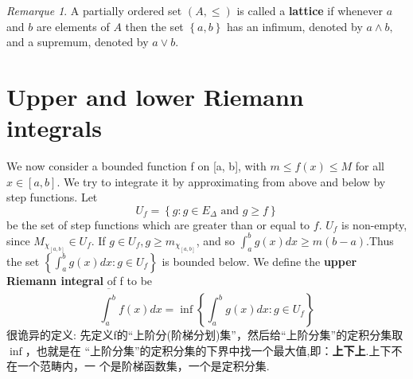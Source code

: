 \documentclass[12pt]{book}
\theoremstyle{definition}\newtheorem{dfn}{Définition}[chapter]
\theoremstyle{plain}\newtheorem{thm}{Théorème}[chapter]
\theoremstyle{plain}\newtheorem{prp}{Proposition}[chapter]
\theoremstyle{plain}\newtheorem{lem}{\bf Lemme}[chapter]
\theoremstyle{plain}\newtheorem{axm}{\bf Axiome}[chapter]
\theoremstyle{plain}\newtheorem{lmm}{\bf Lemme}[chapter]
\theoremstyle{plain}\newtheorem{cor}{\bf Corollaire}[chapter]
\theoremstyle{remark}\newtheorem{rem}{Remarque}[chapter]
\begin{document}
\begin{rem}
A partially ordered set $(A, \le)$ is called a {\bf{lattice}} if
whenever $a$ and $b$ are elements of $A$ then the set $\left\{a,
  b\right\}$ has an infimum, denoted by $a\wedge b,$ and a supremum,
denoted by $a \vee b.$
\end{rem}
\section{Upper and lower Riemann integrals}
We now consider a bounded function f on [a, b], with $m \le f(x) \le M$ for all
$x \in [a, b].$  We try to integrate it by approximating from above and below by
step functions. Let
$$U_f = \left\{g : g \in E_{\Delta}\text{ and }g \ge f\right\}$$
be the set of step functions which are greater than or equal to $f$. $U_f$ is
non-empty, since $M_{\chi_{[a,b]}} \in U_f$. If $g \in U_f, g \ge m_{\chi_{[a,b]}}$, and so
$\int_{a}^{b}g(x) dx \ge m(b-a)$.Thus the set $\left\{\int^b_a g(x) dx : g \in U_f\right\}$ is bounded below. We define
the {\bf upper Riemann integral} of f to be
$$
\overline{\int^b_a}f(x)d x=\inf\left\{\int^b_a g(x) dx : g \in U_f\right\}
$$
很诡异的定义: 先定义f的“上阶分(阶梯分划)集”，然后给“上阶分集”的定积分集取$\inf$，也就是在
“上阶分集”的定积分集的下界中找一个最大值,即：{\bf 上下上}.上下不在一个范畴内，一
个是阶梯函数集，一个是定积分集.
\end{document}
